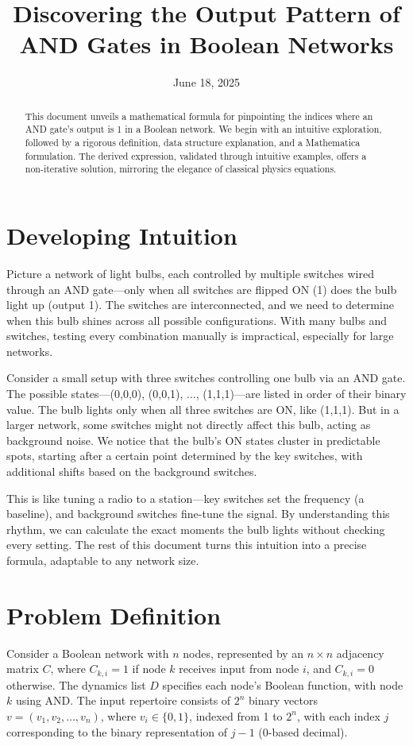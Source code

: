 \documentclass[12pt]{article}
\title{Discovering the Output Pattern of AND Gates in Boolean Networks}
\author{}
\date{June 18, 2025}
\begin{document}
\maketitle

\begin{abstract}
This document unveils a mathematical formula for pinpointing the indices where an AND gate's output is 1 in a Boolean network. We begin with an intuitive exploration, followed by a rigorous definition, data structure explanation, and a Mathematica formulation. The derived expression, validated through intuitive examples, offers a non-iterative solution, mirroring the elegance of classical physics equations.
\end{abstract}

\section{Developing Intuition}
Picture a network of light bulbs, each controlled by multiple switches wired through an AND gate—only when all switches are flipped ON (1) does the bulb light up (output 1). The switches are interconnected, and we need to determine when this bulb shines across all possible configurations. With many bulbs and switches, testing every combination manually is impractical, especially for large networks.

Consider a small setup with three switches controlling one bulb via an AND gate. The possible states—(0,0,0), (0,0,1), ..., (1,1,1)—are listed in order of their binary value. The bulb lights only when all three switches are ON, like (1,1,1). But in a larger network, some switches might not directly affect this bulb, acting as background noise. We notice that the bulb’s ON states cluster in predictable spots, starting after a certain point determined by the key switches, with additional shifts based on the background switches.

This is like tuning a radio to a station—key switches set the frequency (a baseline), and background switches fine-tune the signal. By understanding this rhythm, we can calculate the exact moments the bulb lights without checking every setting. The rest of this document turns this intuition into a precise formula, adaptable to any network size.

\section{Problem Definition}
Consider a Boolean network with \( n \) nodes, represented by an \( n \times n \) adjacency matrix \( C \), where \( C_{k,i} = 1 \) if node \( k \) receives input from node \( i \), and \( C_{k,i} = 0 \) otherwise. The dynamics list \( D \) specifies each node’s Boolean function, with node \( k \) using AND. The input repertoire consists of \( 2^n \) binary vectors \( v = (v_1, v_2, \dots, v_n) \), where \( v_i \in \{0, 1\} \), indexed from 1 to \( 2^n \), with each index \( j \) corresponding to the binary representation of \( j-1 \) (0-based decimal).
\end{document}
